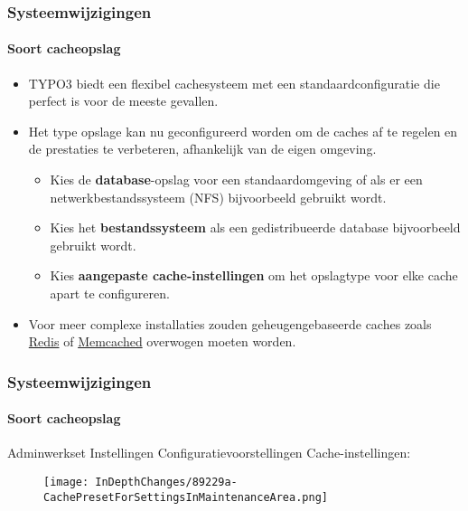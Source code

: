 \begin{frame}[fragile]
	\frametitle{Systeemwijzigingen}
	\framesubtitle{Soort cacheopslag}

	\begin{itemize}

		\item TYPO3 biedt een flexibel cachesysteem met een standaardconfiguratie
			die perfect is voor de meeste gevallen.
		\item Het type opslage kan nu geconfigureerd worden om de caches af te regelen en
			de prestaties te verbeteren, afhankelijk van de eigen omgeving.

		\begin{itemize}
			\item Kies de \textbf{database}-opslag voor een standaardomgeving
				of als er een netwerkbestandssysteem (NFS) bijvoorbeeld gebruikt wordt.
			\item Kies het \textbf{bestandssysteem} als een gedistribueerde database
				bijvoorbeeld gebruikt wordt.
			\item Kies \textbf{aangepaste cache-instellingen} om het opslagtype
				voor elke cache apart te configureren.
		\end{itemize}

		\item Voor meer complexe installaties zouden geheugengebaseerde caches zoals
			\href{https://redis.io/}{Redis}
			of
			\href{https://memcached.org/}{Memcached}
			overwogen moeten worden.

	\end{itemize}

\end{frame}


\begin{frame}[fragile]
	\frametitle{Systeemwijzigingen}
	\framesubtitle{Soort cacheopslag}

	Adminwerkset \hspace{0.1cm}Instellingen \hspace{0.1cm}Configuratievoorstellingen \hspace{0.1cm}Cache-instellingen:

	\begin{figure}
		\texttt{[image: InDepthChanges/89229a-CachePresetForSettingsInMaintenanceArea.png]}
	\end{figure}

\end{frame}

